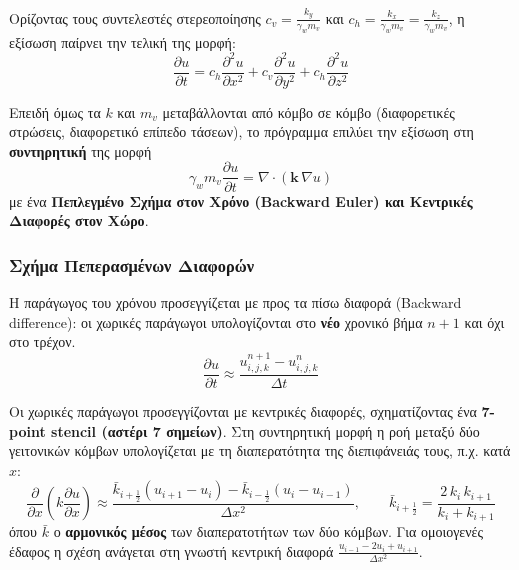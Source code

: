 \documentclass[11pt,a4paper]{article}
\begin{document}
Ορίζοντας τους συντελεστές στερεοποίησης $c_v = \frac{k_y}{\gamma_w m_v}$ και $c_h = \frac{k_x}{\gamma_w m_v} = \frac{k_z}{\gamma_w m_v}$, η εξίσωση παίρνει την τελική της μορφή:
\begin{equation}
  \frac{\partial u}{\partial t} = c_h \frac{\partial^2 u}{\partial x^2} + c_v \frac{\partial^2 u}{\partial y^2} + c_h \frac{\partial^2 u}{\partial z^2}
\end{equation}

Επειδή όμως τα $k$ και $m_v$ μεταβάλλονται από κόμβο σε κόμβο (διαφορετικές στρώσεις, διαφορετικό επίπεδο τάσεων), το πρόγραμμα επιλύει την εξίσωση στη \textbf{συντηρητική} της μορφή
\begin{equation}
  \gamma_w m_v \frac{\partial u}{\partial t} = \nabla\cdot\left(\mathbf{k}\,\nabla u\right)
\end{equation}
με ένα \textbf{Πεπλεγμένο Σχήμα στον Χρόνο (Backward Euler) και Κεντρικές Διαφορές στον Χώρο}.

\subsubsection{Σχήμα Πεπερασμένων Διαφορών}\label{sec:fd}

Η παράγωγος του χρόνου προσεγγίζεται με προς τα πίσω διαφορά (Backward difference): οι χωρικές παράγωγοι υπολογίζονται στο \textbf{νέο} χρονικό βήμα $n+1$ και όχι στο τρέχον.
\begin{equation}
  \frac{\partial u}{\partial t} \approx \frac{u^{n+1}_{i,j,k} - u^{n}_{i,j,k}}{\Delta t}
\end{equation}

Οι χωρικές παράγωγοι προσεγγίζονται με κεντρικές διαφορές, σχηματίζοντας ένα \textbf{7-point stencil (αστέρι 7 σημείων)}. Στη συντηρητική μορφή η ροή μεταξύ δύο γειτονικών κόμβων υπολογίζεται με τη διαπερατότητα της διεπιφάνειάς τους, π.χ. κατά $x$:
\begin{equation}\label{eq:flux}
  \frac{\partial}{\partial x}\left(k\frac{\partial u}{\partial x}\right) \approx \frac{\bar{k}_{i+\frac12}\left(u_{i+1}-u_i\right) - \bar{k}_{i-\frac12}\left(u_i-u_{i-1}\right)}{\Delta x^2},
  \qquad \bar{k}_{i+\frac12} = \frac{2\,k_i\,k_{i+1}}{k_i + k_{i+1}}
\end{equation}
όπου $\bar{k}$ ο \textbf{αρμονικός μέσος} των διαπερατοτήτων των δύο κόμβων. Για ομοιογενές έδαφος η σχέση ανάγεται στη γνωστή κεντρική διαφορά $\frac{u_{i-1} - 2u_i + u_{i+1}}{\Delta x^2}$.
\end{document}
